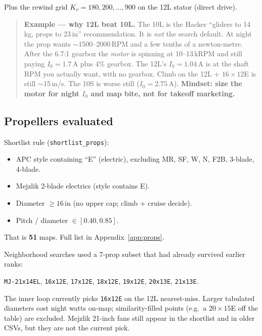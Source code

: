 \documentclass[11pt,letterpaper]{article}
\newcommand{\code}[1]{\texttt{#1}}
\newenvironment{examplebox}{\begin{quote}\small}{\end{quote}}
\begin{document}
Plus the rewind grid $K_v = 180, 200, \ldots, 900$ on the 12L stator (direct drive).

\begin{examplebox}
\textbf{Example --- why 12L beat 10L.}
The 10L is the Hacker ``gliders to 14\,kg, props to 23\,in'' recommendation. It is \emph{not} the search default. At night the prop wants $\sim$1500--2000\,RPM and a few tenths of a newton-metre. After the 6.7:1 gearbox the \emph{motor} is spinning at 10--13\,kRPM and still paying $I_0 = 1.7\,\mathrm{A}$ plus 4\% gearbox. The 12L's $I_0 = 1.04\,\mathrm{A}$ is at the shaft RPM you actually want, with no gearbox. Climb on the 12L + $16\times12$E is still $\sim$15\,m/s. The 10S is worse still ($I_0 = 2.75\,\mathrm{A}$). \textbf{Mindset: size the motor for night $I_0$ and map bite, not for takeoff marketing.}
\end{examplebox}

\subsection{Propellers evaluated}
\label{sec:props}

Shortlist rule (\code{shortlist\_props}):

\begin{itemize}
  \item APC style containing ``E'' (electric), excluding MR, SF, W, N, F2B, 3-blade, 4-blade.
  \item Mejzlik 2-blade electrics (style contains E).
  \item Diameter $\ge 16\,\mathrm{in}$ (no upper cap; climb + cruise decide).
  \item Pitch / diameter $\in [0.40, 0.85]$.
\end{itemize}

That is \textbf{51} maps. Full list in Appendix~\ref{app:props}.

Neighborhood searches used a 7-prop subset that had already survived earlier ranks:

\begin{center}
\texttt{MJ-21x14EL}, \texttt{16x12E}, \texttt{17x12E}, \texttt{18x12E},
\texttt{19x12E}, \texttt{20x13E}, \texttt{21x13E}.
\end{center}

The inner loop currently picks \texttt{16x12E} on the 12L nearest-miss. Larger tabulated diameters cost night watts on-map; similarity-filled points (e.g.\ a $20\times15$E off the table) are excluded. Mejzlik 21-inch fans still appear in the shortlist and in older CSVs, but they are not the current pick.
\end{document}
